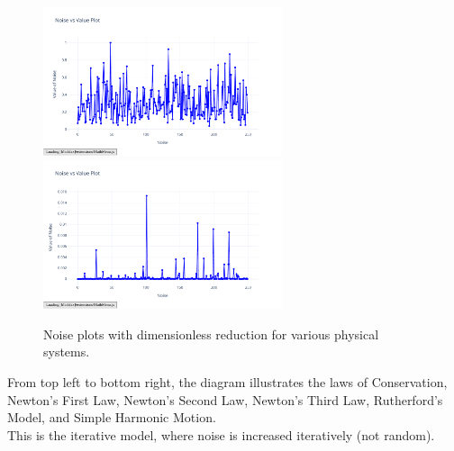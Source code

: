 \documentclass{article}
\begin{document}
\begin{figure}[H]
    \includegraphics[width=7cm]{noise_Rutherford_d_r}
    \includegraphics[width=7cm]{noise_Simple_Harmonic_Motion_d_r}
    \caption{Noise plots with dimensionless reduction for various physical systems.}
    \label{fig:noise_dimless_plots}
\end{figure}

From top left to bottom right, the diagram illustrates the laws of Conservation, Newton's First Law, Newton's Second Law, Newton's Third Law, Rutherford's Model, and Simple Harmonic Motion.\\
This is the iterative model, where noise is increased iteratively (not random).\\ 
\end{document}
